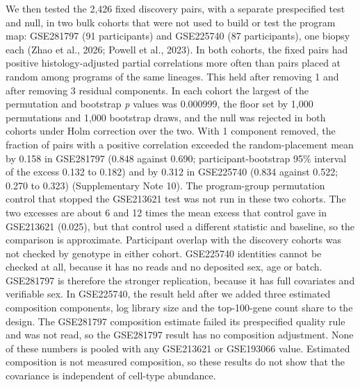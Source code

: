 We then tested the 2,426 fixed discovery pairs, with a separate prespecified test and null, in two bulk cohorts that were not used to build or test the program map: GSE281797 (91 participants) and GSE225740 (87 participants), one biopsy each (Zhao et al., 2026; Powell et al., 2023). In both cohorts, the fixed pairs had positive histology-adjusted partial correlations more often than pairs placed at random among programs of the same lineages. This held after removing 1 and after removing 3 residual components. In each cohort the largest of the permutation and bootstrap \emph{p} values was 0.000999, the floor set by 1,000 permutations and 1,000 bootstrap draws, and the null was rejected in both cohorts under Holm correction over the two. With 1 component removed, the fraction of pairs with a positive correlation exceeded the random-placement mean by 0.158 in GSE281797 (0.848 against 0.690; participant-bootstrap 95\% interval of the excess 0.132 to 0.182) and by 0.312 in GSE225740 (0.834 against 0.522; 0.270 to 0.323) (Supplementary Note 10). The program-group permutation control that stopped the GSE213621 test was not run in these two cohorts. The two excesses are about 6 and 12 times the mean excess that control gave in GSE213621 (0.025), but that control used a different statistic and baseline, so the comparison is approximate. Participant overlap with the discovery cohorts was not checked by genotype in either cohort. GSE225740 identities cannot be checked at all, because it has no reads and no deposited sex, age or batch. GSE281797 is therefore the stronger replication, because it has full covariates and verifiable sex. In GSE225740, the result held after we added three estimated composition components, log library size and the top-100-gene count share to the design. The GSE281797 composition estimate failed its prespecified quality rule and was not read, so the GSE281797 result has no composition adjustment. None of these numbers is pooled with any GSE213621 or GSE193066 value. Estimated composition is not measured composition, so these results do not show that the covariance is independent of cell-type abundance.

